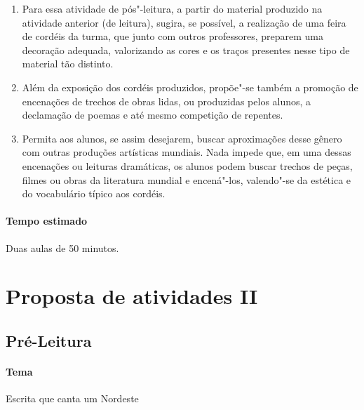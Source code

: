 \documentclass[12pt]{extarticle}
\begin{document}
{\begin{enumerate}
\item
Para essa atividade de pós"-leitura, a partir do material produzido na 
atividade anterior (de leitura), sugira, se possível, a realização de 
uma feira de cordéis da turma, que junto com outros professores, preparem 
uma decoração adequada, valorizando as cores e os traços presentes nesse 
tipo de material tão distinto. 

\item
Além da exposição dos cordéis produzidos, propõe"-se também a
promoção de encenações de trechos de obras lidas, ou produzidas pelos
alunos, a declamação de poemas e até mesmo competição de repentes. 

\item
Permita aos alunos, se assim desejarem, buscar aproximações desse gênero 
com outras produções artísticas mundiais. Nada impede que, em uma dessas 
encenações ou leituras dramáticas, os alunos podem buscar trechos de peças, 
filmes ou obras da literatura mundial e encená"-los, valendo"-se da 
estética e do vocabulário típico aos cordéis.

\end{enumerate}

\paragraph{Tempo estimado} Duas aulas de 50 minutos. 

\section{Proposta de atividades II}


\subsection{Pré-Leitura}

\paragraph{Tema} Escrita que canta um Nordeste 

}
\end{document}
